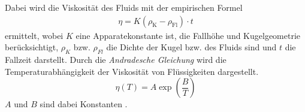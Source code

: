 Dabei wird die Viskosität des Fluids mit der empirischen Formel 
\begin{align}
    \label{eq:empirisch}
    \eta = K \left(\rho_\text{K} -\rho_\text{Fl}\right) \cdot t
\end{align}
\noindent
ermittelt, wobei $K$ eine Apparatekonstante ist, die Fallhöhe und Kugelgeometrie berücksichtigt,
$\rho_K$ bzw. $\rho_{Fl}$ die Dichte der Kugel bzw. des Fluids sind und $t$ die Fallzeit darstellt.
\noindent
%
Durch die \textit{Andradesche Gleichung} wird die Temperaturabhängigkeit der Viskosität von Flüssigkeiten dargestellt.
\begin{equation}
\label{eq:andrade}
    \eta \left(T\right) = A \exp{\left(\frac{B}{T}\right)}
\end{equation}
$A$ und $B$ sind dabei Konstanten \cite*[]{va207}.

